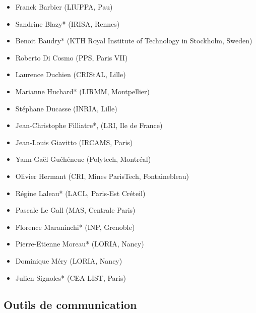 \documentclass[11pt]{article}
\begin{document}
\begin{itemize}
    \item Franck Barbier (LIUPPA, Pau)
    \item Sandrine Blazy*  (IRISA, Rennes)
    \item Benoit Baudry* (KTH Royal Institute of Technology in Stockholm, Sweden)
    \item Roberto Di Cosmo (PPS, Paris VII)
    \item Laurence Duchien (CRIStAL, Lille)
    \item Marianne Huchard* (LIRMM, Montpellier)
    \item  Stéphane Ducasse (INRIA, Lille)
    \item Jean-Christophe Filliatre*, (LRI, Ile de France)
    \item Jean-Louis Giavitto (IRCAMS, Paris)
    \item Yann-Gaël Guéhéneuc (Polytech, Montréal)
    \item Olivier Hermant (CRI, Mines ParisTech, Fontainebleau)
    \item Régine Laleau* (LACL, Paris-Est Créteil)
    \item Pascale Le Gall (MAS, Centrale Paris)
    \item Florence  Maraninchi* (INP, Grenoble)
    \item Pierre-Etienne Moreau* (LORIA, Nancy)
   \item Dominique Méry (LORIA, Nancy)
    \item Julien Signoles* (CEA LIST, Paris)
 \end{itemize}   

 \medskip

 \noindent

\subsection{Outils de communication}

\end{document}

